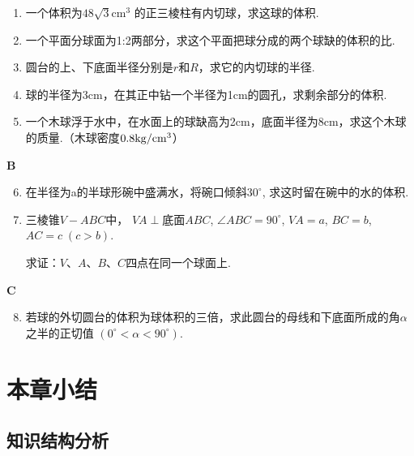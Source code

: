 \begin{enumerate}
    \item 一个体积为$48\sqrt{3}\mathrm{cm}^{3}$ 的正三棱柱有内切球，求这球的体积.

    \item 一个平面分球面为1:2两部分，求这个平面把球分成的两个球缺的体积的比.
    \item 
圆台的上、下底面半径分别是$r$和$R$，求它的内切球的半径.
    \item 
球的半径为3cm，在其正中钻一个半径为1cm的圆孔，求剩余部分的体积.
    \item 
一个木球浮于水中，在水面上的球缺高为2cm，底面半径为8cm，求这个木球的质量.（木球密度$0.8{\rm kg}/{\rm cm}^3$）
\end{enumerate}

\begin{center}
    \bfseries B
\end{center}

\begin{enumerate}
\setcounter{enumi}{5}   
 \item 在半径为a的半球形碗中盛满水，将碗口倾斜$30^{\circ}$, 求这时留在碗中的水的体积.
 \item 三棱锥$V-ABC$中， $VA\perp \text{底面} ABC$,  $\angle ABC=90^{\circ}$,  $VA=a$, $ BC=b$,  $AC=c\; (c>b)$. 
 
 求证：$V$、$A$、$B$、$C$四点在同一个球面上.
\end{enumerate}


\begin{center}
    \bfseries C
\end{center}

\begin{enumerate}
\setcounter{enumi}{7}
\item 若球的外切圆台的体积为球体积的三倍，求此圆台的母线和下底面所成的角$\alpha$之半的正切值 $\left(0^{\circ}<\alpha<90^{\circ}\right)$.
\end{enumerate}

\section{本章小结}
\subsection{知识结构分析}

